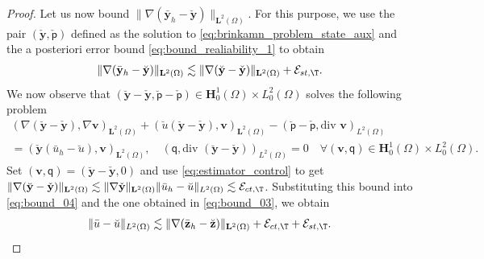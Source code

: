 \documentclass[final]{siamart0216}
\begin{document}
\begin{proof}
Let us now bound $\|\nabla(\bar{\mathbf{y}}_{h}-\breve{\mathbf{y}})\|_{\mathbf{L}^2(\Omega)}$. For this purpose, we use the pair $(\check{\mathbf{y}},\check{\mathsf{p}})$ defined as the solution to \eqref{eq:brinkamn_problem_state_aux} and the a posteriori error bound \eqref{eq:bound_realiability_1} to obtain
\begin{align}\label{eq:bound_04}
\|\nabla(\bar{\mathbf{y}}_{h}-\breve{\mathbf{y}})\|_{\mathbf{L}^2(\Omega)}\lesssim \|\nabla(\breve{\mathbf{y}}-\check{\mathbf{y}})\|_{\mathbf{L}^2(\Omega)}+\mathcal{E}_{st,\T}.
\end{align}
We now observe that $(\breve{\mathbf{y}}-\check{\mathbf{y}},\breve{\mathsf{p}}-\check{\mathsf{p}})\in \mathbf{H}_0^1(\Omega)\times L_0^2(\Omega)$ solves the following problem
\begin{multline*}\label{eq:brinkamn_problem_state_aux_error}
(\nabla (\breve{\mathbf{y}} - \check{\mathbf{y}}),\nabla \mathbf{v})_{\mathbf{L}^2(\Omega)}
+
( \breve{u}(\breve{\mathbf{y}}\!-\!\check{\mathbf{y}}), \mathbf{v})_{\mathbf{L}^2(\Omega)} 
-
(\breve{\mathsf{p}}\!-\!\check{\mathsf{p}},\text{div }\mathbf{v})_{L^2(\Omega)} 
\\
=  	(\check{\mathbf{y}}(\bar{u}_h\!-\!\breve{u}),\mathbf{v})_{\mathbf{L}^2(\Omega)},\quad
(\mathsf{q},\text{div }(\breve{\mathbf{y}}-\check{\mathbf{y}}))_{L^2(\Omega)} = 0\quad\forall (\mathbf{v},\mathsf{q})\in  \mathbf{H}_0^1(\Omega)\times L_0^2(\Omega).
\end{multline*}
Set $(\mathbf{v},\mathsf{q}) = (\breve{\mathbf{y}}-\check{\mathbf{y}},0)$ and use \eqref{eq:estimator_control} to get
$\|\nabla (\breve{\mathbf{y}}-\check{\mathbf{y}})\|_{\mathbf{L}^2(\Omega)} \lesssim \|\nabla \check{\mathbf{y}}\|_{\mathbf{L}^2(\Omega)}\|\bar{u}_{h}-\breve{u}\|_{L^2(\Omega)}\lesssim \mathcal{E}_{ct,\T}$.
Substituting this bound into \eqref{eq:bound_04} and the one obtained in \eqref{eq:bound_03}, we obtain
\begin{align}\label{eq:bound_05}
	\|\bar{u}-\breve{u}\|_{L^2(\Omega)}\lesssim \|\nabla(\bar{\mathbf{z}}_{h}-\breve{\mathbf{z}})\|_{\mathbf{L}^2(\Omega)}+ \mathcal{E}_{ct,\T}+\mathcal{E}_{st,\T}.
\end{align}


\end{proof}
\end{document}
